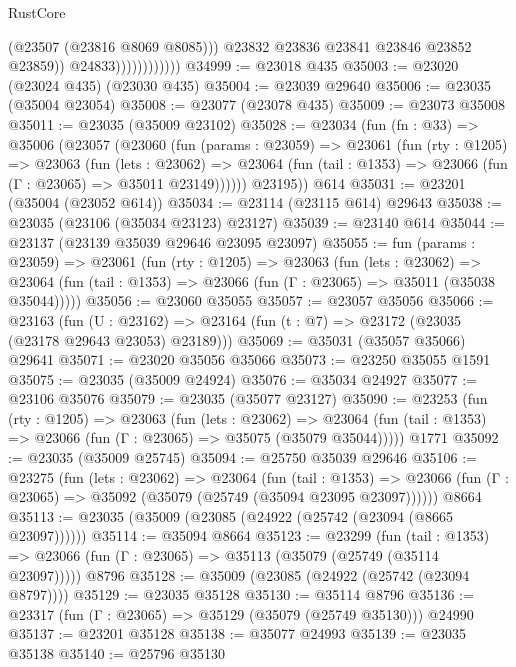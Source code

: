 \begin{lexlean}{RustCore}
\begin{coremodule}
                                  (@23507 (@23816 @8069 @8085)))
                                @23832
                                @23836
                                @23841
                                @23846
                                @23852
                                @23859))
                            @24833))))))))))))
@34999 := @23018 @435
@35003 := @23020 (@23024 @435) (@23030 @435)
@35004 := @23039 @29640
@35006 := @23035 (@35004 @23054)
@35008 := @23077 (@23078 @435)
@35009 := @23073 @35008
@35011 := @23035 (@35009 @23102)
@35028 := @23034
    (fun (fn : @33) =>
    @35006
      (@23057
        (@23060
          (fun (params : @23059) =>
          @23061
            (fun (rty : @1205) =>
            @23063
              (fun (lets : @23062) =>
              @23064 (fun (tail : @1353) => @23066 (fun (Γ : @23065) => @35011 @23149))))))
        @23195))
    @614
@35031 := @23201 (@35004 (@23052 @614))
@35034 := @23114 (@23115 @614) @29643
@35038 := @23035 (@23106 (@35034 @23123) @23127)
@35039 := @23140 @614
@35044 := @23137 (@23139 @35039 @29646 @23095 @23097)
@35055 := fun (params : @23059) =>
  @23061
    (fun (rty : @1205) =>
    @23063
      (fun (lets : @23062) =>
      @23064 (fun (tail : @1353) => @23066 (fun (Γ : @23065) => @35011 (@35038 @35044)))))
@35056 := @23060 @35055
@35057 := @23057 @35056
@35066 := @23163
    (fun (U : @23162) => @23164 (fun (t : @7) => @23172 (@23035 (@23178 @29643 @23053) @23189)))
@35069 := @35031 (@35057 @35066) @29641
@35071 := @23020 @35056 @35066
@35073 := @23250 @35055 @1591
@35075 := @23035 (@35009 @24924)
@35076 := @35034 @24927
@35077 := @23106 @35076
@35079 := @23035 (@35077 @23127)
@35090 := @23253
    (fun (rty : @1205) =>
    @23063
      (fun (lets : @23062) =>
      @23064 (fun (tail : @1353) => @23066 (fun (Γ : @23065) => @35075 (@35079 @35044)))))
    @1771
@35092 := @23035 (@35009 @25745)
@35094 := @25750 @35039 @29646
@35106 := @23275
    (fun (lets : @23062) =>
    @23064
      (fun (tail : @1353) =>
      @23066 (fun (Γ : @23065) => @35092 (@35079 (@25749 (@35094 @23095 @23097))))))
    @8664
@35113 := @23035 (@35009 (@23085 (@24922 (@25742 (@23094 (@8665 @23097))))))
@35114 := @35094 @8664
@35123 := @23299
    (fun (tail : @1353) => @23066 (fun (Γ : @23065) => @35113 (@35079 (@25749 (@35114 @23097)))))
    @8796
@35128 := @35009 (@23085 (@24922 (@25742 (@23094 @8797))))
@35129 := @23035 @35128
@35130 := @35114 @8796
@35136 := @23317 (fun (Γ : @23065) => @35129 (@35079 (@25749 @35130))) @24990
@35137 := @23201 @35128
@35138 := @35077 @24993
@35139 := @23035 @35138
@35140 := @25796 @35130

\end{coremodule}
\end{lexlean}
